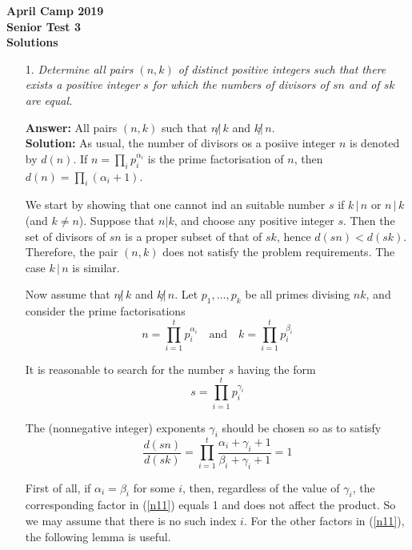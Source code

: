 \documentclass[a4paper, 12pt]{article}
\begin{document}
\begin{center}
\textbf{April Camp 2019 \\ Senior Test 3} \\
\textbf{Solutions}
\end{center}
\vspace{5mm}

\begin{enumerate}

\item[1.]  \textit{ Determine all pairs $(n, k)$ of distinct positive integers such that there exists a positive integer $s$ for which the numbers of divisors of $sn$ and of $sk$ are equal.
}
\vspace{5mm}

\textbf{Answer:} All pairs $(n, k)$ such that $n \not |\, k$ and $k \not |\, n$. \\

\textbf{Solution:}  As usual, the number of divisors os a posiive integer $n$ is denoted by $d(n)$. If $n = \prod_i p_i^{\alpha_i}$ is the prime factorisation of $n$, then $d(n) = \prod_i(\alpha_i + 1)$.

We start by showing that one cannot ind an suitable number $s$ if $k \,|\, n$ or $n \,|\, k$ (and $k \not = n$). Suppose that $n | k$, and choose any positive integer $s$. Then the set of divisors of $sn$ is a proper subset of that of $sk$, hence $d(sn) < d(sk)$. Therefore, the pair $(n, k)$ does not satisfy the problem requirements. The case $k \,|\, n$ is similar.

Now assume that $n \not |\, k$ and $k \not |\, n$. Let $p_1, \dots, p_k$ be all primes divising $nk$, and consider the prime factorisations
$$
n = \prod_{i=1}^t p_i^{\alpha_i} \quad \textrm{and} \quad 
k = \prod_{i=1}^t p_i^{\beta_i}
$$

It is reasonable to search for the number $s$ having the form
$$
s = \prod_{i=1}^t p_i^{\gamma_i}
$$

The (nonnegative integer) exponents $\gamma_i$ should be chosen so as to satisfy
\begin{equation} \label{n11}
    \frac{d(sn)}{d(sk)} = \prod_{i=1}^t  \frac{\alpha_i + \gamma_i + 1}{\beta_i + \gamma_i + 1} = 1    
\end{equation}

First of all, if $\alpha_i = \beta_i$ for some $i$, then, regardless of the value of $\gamma_i$, the corresponding factor in (\ref{n11}) equals 1 and does not affect the product. So we may assume that there is no such index $i$. For the other factors in (\ref{n11}), the following lemma is useful.


\end{enumerate}
\end{document}
